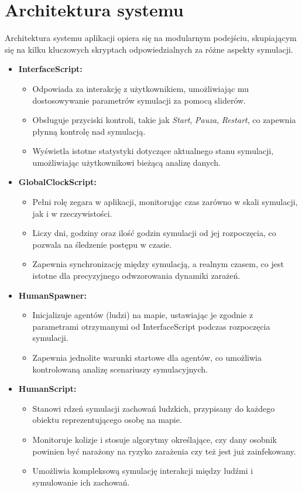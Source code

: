 \section{\textbf{Architektura systemu}}

Architektura systemu aplikacji opiera się na modularnym podejściu, skupiającym się na kilku kluczowych skryptach odpowiedzialnych za różne aspekty symulacji.

\begin{itemize}
	\item \textbf{InterfaceScript:}
	\begin{itemize}
		\item Odpowiada za interakcję z użytkownikiem, umożliwiając mu dostosowywanie parametrów symulacji za pomocą sliderów.
		\item Obsługuje przyciski kontroli, takie jak \textit{Start}, \textit{Pauza}, \textit{Restart}, co zapewnia płynną kontrolę nad symulacją.
		\item Wyświetla istotne statystyki dotyczące aktualnego stanu symulacji, umożliwiając użytkownikowi bieżącą analizę danych.
	\end{itemize}
	
	\item \textbf{GlobalClockScript:}
	\begin{itemize}
		\item Pełni rolę zegara w aplikacji, monitorując czas zarówno w skali symulacji, jak i w rzeczywistości.
		\item Liczy dni, godziny oraz ilość godzin symulacji od jej rozpoczęcia, co pozwala na śledzenie postępu w czasie.
		\item Zapewnia synchronizację między symulacją, a realnym czasem, co jest istotne dla precyzyjnego odwzorowania dynamiki zarażeń.
	\end{itemize}
	
	\item \textbf{HumanSpawner:}
	\begin{itemize}
		\item Inicjalizuje agentów (ludzi) na mapie, ustawiając je zgodnie z parametrami otrzymanymi od InterfaceScript podczas rozpoczęcia symulacji.
		\item Zapewnia jednolite warunki startowe dla agentów, co umożliwia kontrolowaną analizę scenariuszy symulacyjnych.
	\end{itemize}
	
	\item \textbf{HumanScript:}
	\begin{itemize}
		\item Stanowi rdzeń symulacji zachowań ludzkich, przypisany do każdego obiektu reprezentującego osobę na mapie.
		\item Monitoruje kolizje i stosuje algorytmy określające, czy dany osobnik powinien być narażony na ryzyko zarażenia czy też jest już zainfekowany.
		\item Umożliwia kompleksową symulację interakcji między ludźmi i symulowanie ich zachowań.
	\end{itemize}
	

\end{itemize}
